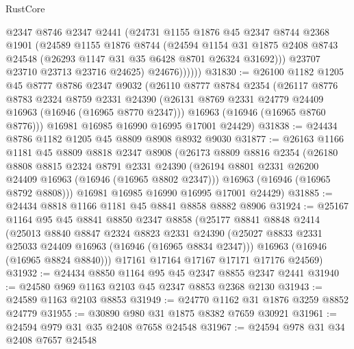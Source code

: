 \begin{lexlean}{RustCore}
\begin{coremodule}
                @2347
                @8746
                @2347
                @2441
                (@24731
                  @1155
                  @1876
                  @45
                  @2347
                  @8744
                  @2368
                  @1901
                  (@24589
                    @1155
                    @1876
                    @8744
                    (@24594
                      @1154
                      @31
                      @1875
                      @2408
                      @8743
                      @24548
                      (@26293 @1147 @31 @35 @6428 @8701 @26324 @31692)))
                  @23707
                  @23710
                  @23713
                  @23716
                  @24625)
                @24676))))))
@31830 := @26100
    @1182
    @1205
    @45
    @8777
    @8786
    @2347
    @9032
    (@26110
      @8777
      @8784
      @2354
      (@26117
        @8776
        @8783
        @2324
        @8759
        @2331
        @24390
        (@26131 @8769 @2331 @24779 @24409 @16963 (@16946 (@16965 @8770 @2347)))
        @16963
        (@16946 (@16965 @8760 @8776)))
      @16981
      @16985
      @16990
      @16995
      @17001
      @24429)
@31838 := @24434 @8786 @1182 @1205 @45 @8809 @8908 @8932 @9030
@31877 := @26163
    @1166
    @1181
    @45
    @8809
    @8818
    @2347
    @8908
    (@26173
      @8809
      @8816
      @2354
      (@26180
        @8808
        @8815
        @2324
        @8791
        @2331
        @24390
        (@26194 @8801 @2331 @26200 @24409 @16963 (@16946 (@16965 @8802 @2347)))
        @16963
        (@16946 (@16965 @8792 @8808)))
      @16981
      @16985
      @16990
      @16995
      @17001
      @24429)
@31885 := @24434 @8818 @1166 @1181 @45 @8841 @8858 @8882 @8906
@31924 := @25167
    @1164
    @95
    @45
    @8841
    @8850
    @2347
    @8858
    (@25177
      @8841
      @8848
      @2414
      (@25013
        @8840
        @8847
        @2324
        @8823
        @2331
        @24390
        (@25027 @8833 @2331 @25033 @24409 @16963 (@16946 (@16965 @8834 @2347)))
        @16963
        (@16946 (@16965 @8824 @8840)))
      @17161
      @17164
      @17167
      @17171
      @17176
      @24569)
@31932 := @24434 @8850 @1164 @95 @45 @2347 @8855 @2347 @2441
@31940 := @24580 @969 @1163 @2103 @45 @2347 @8853 @2368 @2130
@31943 := @24589 @1163 @2103 @8853
@31949 := @24770 @1162 @31 @1876 @3259 @8852 @24779
@31955 := @30890 @980 @31 @1875 @8382 @7659 @30921
@31961 := @24594 @979 @31 @35 @2408 @7658 @24548
@31967 := @24594 @978 @31 @34 @2408 @7657 @24548

\end{coremodule}
\end{lexlean}
